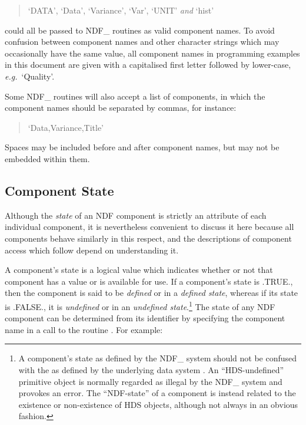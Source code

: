 \documentclass[twoside,11pt,nolof]{starlink}
\providecommand{\st}[1]{{\emph{#1}}}
\begin{document}
\small
\begin{quote}
\begin{center}
`DATA', `Data', `Variance', `Var', `UNIT' \st{and\/} `hist'
\end{center}
\end{quote}
\normalsize

could all be passed to NDF\_ routines as valid component names.
To avoid confusion between component names and other character strings which may
occasionally have the same value, all component names in programming examples in
this document are given with a capitalised first  letter followed by lower-case,
\st{e.g.}\ `Quality'.

Some NDF\_ routines will also accept a list of components, in which the
component names should be separated by commas, for instance:

\small
\begin{quote}
\begin{center}
`Data,Variance,Title'
\end{center}
\end{quote}
\normalsize

Spaces may be included before and after component names, but may not be
embedded within them.

\subsection{Component State}

Although the \st{state\/} of an NDF component is strictly an attribute of
each individual component, it is nevertheless convenient to discuss it here
because all components behave similarly in this respect, and the
descriptions of component access which follow depend on understanding it.

A component's state is a logical value which indicates whether or not that
component has a value or is available for use.
If a component's state is .TRUE., then the component is said to be
\st{defined\/} or in a \st{defined state}, whereas if its state is
.FALSE., it is
\st{undefined\/} or in an \st{undefined state}.\footnote{A
component's state as defined by the NDF\_ system should not be
confused with the  as
defined by the underlying data system . An
``HDS-undefined'' primitive object is normally regarded as illegal by
the NDF\_ system and provokes an error.
The ``NDF-state'' of a component is instead related to the existence
or non-existence of HDS objects, although not always in an obvious
fashion.}
The state of any NDF component can be determined from its identifier by
specifying the component name in a call to the routine .
For example:
\end{document}
